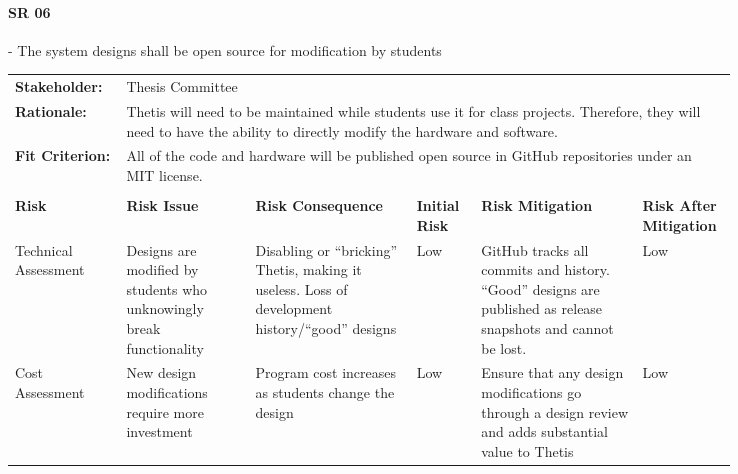 \begin{landscape}


\paragraph*{SR 06} - The system designs shall be open source for modification by students

{\fontsize{8pt}{8pt}\selectfont
\begin{longtable}{| p{0.12\linewidth} | p{0.16\linewidth} |  p{0.20\linewidth} | p{0.08\linewidth} | p{0.20\linewidth} | p{0.08\linewidth} |}
	\hline \endlastfoot
	
	\hline
	\rowcolor[gray]{0.8}
	\multicolumn{6}{|c|}{ } \\
	\hline
	\textbf{Stakeholder:} & \multicolumn{5}{|l|}{Thesis Committee} \\
	\hline
	\textbf{Rationale:} & \multicolumn{5}{|p{0.8\linewidth}|}{Thetis will need to be maintained while students use it for class projects. Therefore, they will need to have the ability to directly modify the hardware and software.} \\
	\hline
	\textbf{Fit Criterion:} & \multicolumn{5}{|p{0.8\linewidth}|}{All of the code and hardware will be published open source in GitHub repositories under an MIT license.} \\
	\hline
	\rowcolor[gray]{0.8}
	\multicolumn{6}{|c|}{ } \\
	\hline
	\textbf{Risk} & \textbf{Risk Issue} & \textbf{Risk Consequence} & \textbf{Initial Risk} & \textbf{Risk Mitigation} & \textbf{Risk \newline After \newline Mitigation} \\
	\hline
	Technical \newline Assessment & Designs are modified by students who unknowingly break functionality & Disabling or ``bricking'' Thetis, making it useless. \newline Loss of development history/``good'' designs & \cellcolor{green} Low & GitHub tracks all commits and history. \newline ``Good'' designs are published as release snapshots and cannot be lost. & \cellcolor{green} Low \\
	\hline
	Cost \newline Assessment & New design modifications require more investment & Program cost increases as students change the design & \cellcolor{green} Low & Ensure that any design modifications go through a design review and adds substantial value to Thetis & \cellcolor{green} Low \\

\end{longtable}}
\end{landscape}
